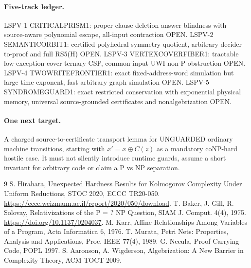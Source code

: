 \documentclass[11pt]{article}
\begin{document}
\paragraph{Five-track ledger.}
LSPV-1 CRITICALPRISM1: proper clause-deletion answer blindness with source-aware polynomial escape, all-input contraction OPEN. LSPV-2 SEMANTICORBIT1: certified polyhedral symmetry quotient, arbitrary decider-to-proof and full RS5(H) OPEN. LSPV-3 VERTEXCOVERFIBER1: tractable low-exception-cover ternary CSP, common-input UWI non-P obstruction OPEN. LSPV-4 TWOWRITEFRONTIER1: exact fixed-address-word simulation but large time exponent, fast arbitrary graph simulation OPEN. LSPV-5 SYNDROMEGUARD1: exact restricted conservation with exponential physical memory, universal source-grounded certificates and nonalgebrization OPEN.

\paragraph{One next target.}
A charged source-to-certificate transport lemma for UNGUARDED ordinary machine transitions, starting with $x'=x\oplus C(z)$ as a mandatory coNP-hard hostile case. It must not silently introduce runtime guards, assume a short invariant for arbitrary code or claim a P vs NP separation.

\begin{thebibliography}{9}
 S. Hirahara, Unexpected Hardness Results for Kolmogorov Complexity Under Uniform Reductions, STOC 2020, ECCC TR20-050. \url{https://eccc.weizmann.ac.il/report/2020/050/download}.
 T. Baker, J. Gill, R. Solovay, Relativizations of the P = ? NP Question, SIAM J. Comput. 4(4), 1975. \url{https://doi.org/10.1137/0204037}.
 M. Karr, Affine Relationships Among Variables of a Program, Acta Informatica 6, 1976.
 T. Murata, Petri Nets: Properties, Analysis and Applications, Proc. IEEE 77(4), 1989.
 G. Necula, Proof-Carrying Code, POPL 1997.
 S. Aaronson, A. Wigderson, Algebrization: A New Barrier in Complexity Theory, ACM TOCT 2009.
\end{thebibliography}
\end{document}
